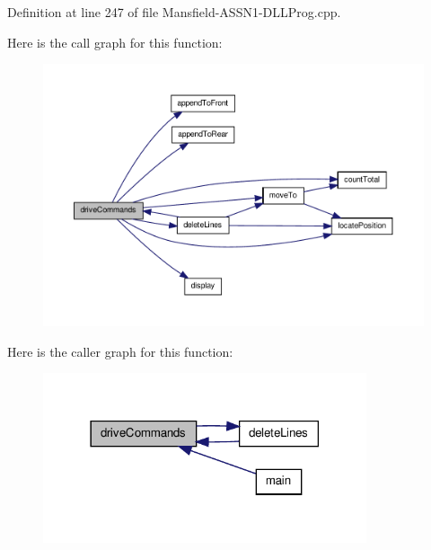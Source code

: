 Definition at line 247 of file Mansfield-\/ASSN1-\/DLLProg.cpp.



Here is the call graph for this function:
\nopagebreak
\begin{figure}[H]
\begin{center}
\leavevmode
\includegraphics[width=400pt]{_mansfield-_a_s_s_n1-_d_l_l_prog_8cpp_a75120516af7833473175d542cdbdd08b_cgraph}
\end{center}
\end{figure}




Here is the caller graph for this function:
\nopagebreak
\begin{figure}[H]
\begin{center}
\leavevmode
\includegraphics[width=270pt]{_mansfield-_a_s_s_n1-_d_l_l_prog_8cpp_a75120516af7833473175d542cdbdd08b_icgraph}
\end{center}
\end{figure}



